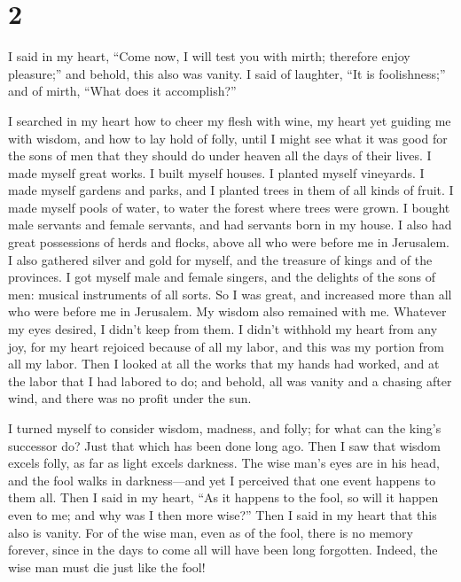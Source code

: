 \hypertarget{section-1}{%
\section{2}\label{section-1}}

 I said in my heart, ``Come now, I will test you with
mirth; therefore enjoy pleasure;'' and behold, this also was vanity.
 I said of laughter, ``It is foolishness;'' and of mirth,
``What does it accomplish?''

 I searched in my heart how to cheer my flesh with wine,
my heart yet guiding me with wisdom, and how to lay hold of folly, until
I might see what it was good for the sons of men that they should do
under heaven all the days of their lives.  I made myself
great works. I built myself houses. I planted myself vineyards.
 I made myself gardens and parks, and I planted trees in
them of all kinds of fruit.  I made myself pools of water,
to water the forest where trees were grown.  I bought male
servants and female servants, and had servants born in my house. I also
had great possessions of herds and flocks, above all who were before me
in Jerusalem.  I also gathered silver and gold for myself,
and the treasure of kings and of the provinces. I got myself male and
female singers, and the delights of the sons of men: musical instruments
of all sorts.  So I was great, and increased more than all
who were before me in Jerusalem. My wisdom also remained with me.
 Whatever my eyes desired, I didn't keep from them. I
didn't withhold my heart from any joy, for my heart rejoiced because of
all my labor, and this was my portion from all my labor. 
Then I looked at all the works that my hands had worked, and at the
labor that I had labored to do; and behold, all was vanity and a chasing
after wind, and there was no profit under the sun.

 I turned myself to consider wisdom, madness, and folly;
for what can the king's successor do? Just that which has been done long
ago.  Then I saw that wisdom excels folly, as far as
light excels darkness.  The wise man's eyes are in his
head, and the fool walks in darkness---and yet I perceived that one
event happens to them all.  Then I said in my heart, ``As
it happens to the fool, so will it happen even to me; and why was I then
more wise?'' Then I said in my heart that this also is vanity.
 For of the wise man, even as of the fool, there is no
memory forever, since in the days to come all will have been long
forgotten. Indeed, the wise man must die just like the fool!

